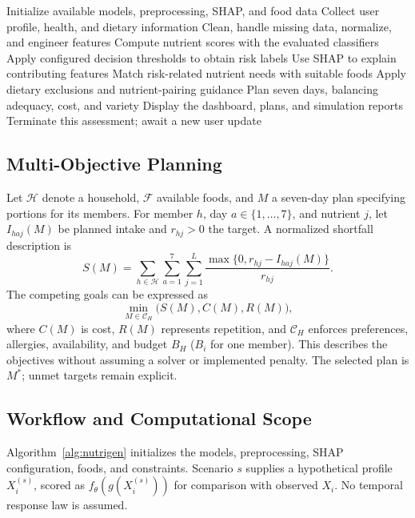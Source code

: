 \documentclass[conference]{IEEEtran}
\begin{document}
\begin{algorithm}[t]
\caption{NutriGen AI assessment and planning}
\label{alg:nutrigen}
Initialize available models, preprocessing, SHAP, and food data\;
Collect user profile, health, and dietary information\;
Clean, handle missing data, normalize, and engineer features\;
Compute nutrient scores with the evaluated classifiers\;
Apply configured decision thresholds to obtain risk labels\;
Use SHAP to explain contributing features\;
Match risk-related nutrient needs with suitable foods\;
Apply dietary exclusions and nutrient-pairing guidance\;
Plan seven days, balancing adequacy, cost, and variety\;
Display the dashboard, plans, and simulation reports\;
Terminate this assessment; await a new user update\;
\end{algorithm}

\subsection{Multi-Objective Planning}
Let $\mathcal{H}$ denote a household, $\mathcal{F}$ available foods, and $M$ a seven-day plan specifying portions for its members. For member $h$, day $a \in \{1, \dots, 7\}$, and nutrient $j$, let $I_{haj}(M)$ be planned intake and $r_{hj} > 0$ the target. A normalized shortfall description is
\begin{equation}
S(M) = \sum_{h \in \mathcal{H}} \sum_{a=1}^7 \sum_{j=1}^L \frac{\max\{0, r_{hj} - I_{haj}(M)\}}{r_{hj}}.
\end{equation}
The competing goals can be expressed as
\begin{equation}
\min_{M \in \mathcal{C}_H} \Big( S(M), C(M), R(M) \Big),
\end{equation}
where $C(M)$ is cost, $R(M)$ represents repetition, and $\mathcal{C}_H$ enforces preferences, allergies, availability, and budget $B_H$ ($B_i$ for one member). This describes the objectives without assuming a solver or implemented penalty. The selected plan is $M^*$; unmet targets remain explicit.

\subsection{Workflow and Computational Scope}
Algorithm~\ref{alg:nutrigen} initializes the models, preprocessing, SHAP configuration, foods, and constraints. Scenario $s$ supplies a hypothetical profile $X_i^{(s)}$, scored as $f_\theta(g(X_i^{(s)}))$ for comparison with observed $X_i$. No temporal response law is assumed.
\end{document}
